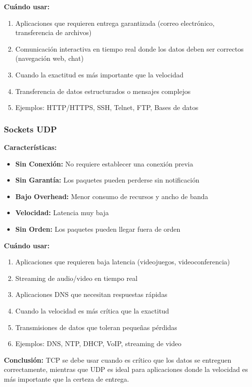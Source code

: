 \documentclass{article}
\begin{document}
\textbf{Cuándo usar:}
\begin{enumerate}
    \item Aplicaciones que requieren entrega garantizada (correo electrónico, transferencia de archivos)
    \item Comunicación interactiva en tiempo real donde los datos deben ser correctos (navegación web, chat)
    \item Cuando la exactitud es más importante que la velocidad
    \item Transferencia de datos estructurados o mensajes complejos
    \item Ejemplos: HTTP/HTTPS, SSH, Telnet, FTP, Bases de datos
\end{enumerate}

\subsubsection{Sockets UDP}

\textbf{Características:}
\begin{itemize}
    \item \textbf{Sin Conexión:} No requiere establecer una conexión previa
    \item \textbf{Sin Garantía:} Los paquetes pueden perderse sin notificación
    \item \textbf{Bajo Overhead:} Menor consumo de recursos y ancho de banda
    \item \textbf{Velocidad:} Latencia muy baja
    \item \textbf{Sin Orden:} Los paquetes pueden llegar fuera de orden
\end{itemize}

\textbf{Cuándo usar:}
\begin{enumerate}
    \item Aplicaciones que requieren baja latencia (videojuegos, videoconferencia)
    \item Streaming de audio/video en tiempo real
    \item Aplicaciones DNS que necesitan respuestas rápidas
    \item Cuando la velocidad es más crítica que la exactitud
    \item Transmisiones de datos que toleran pequeñas pérdidas
    \item Ejemplos: DNS, NTP, DHCP, VoIP, streaming de video
\end{enumerate}

\textbf{Conclusión:}
TCP se debe usar cuando es crítico que los datos se entreguen correctamente, mientras que UDP es ideal para aplicaciones donde la velocidad es más importante que la certeza de entrega.
\end{document}
